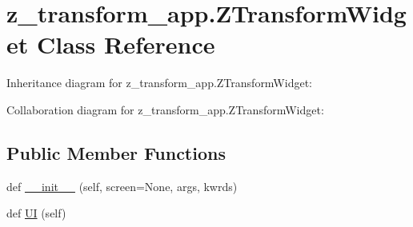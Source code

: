 \hypertarget{classz__transform__app_1_1ZTransformWidget}{}\section{z\+\_\+transform\+\_\+app.\+Z\+Transform\+Widget Class Reference}
\label{classz__transform__app_1_1ZTransformWidget}


Inheritance diagram for z\+\_\+transform\+\_\+app.\+Z\+Transform\+Widget\+:


Collaboration diagram for z\+\_\+transform\+\_\+app.\+Z\+Transform\+Widget\+:
\subsection*{Public Member Functions}
\begin{DoxyCompactItemize}
\item 
def \hyperlink{classz__transform__app_1_1ZTransformWidget_a730d716201ec9a62a188b9ec39ff288f}{\+\_\+\+\_\+init\+\_\+\+\_\+} (self, screen=None, args, kwrds)
\item 
def \hyperlink{classz__transform__app_1_1ZTransformWidget_ad806831916f7d8246a281dbcc3ea58f7}{UI} (self)
\end{DoxyCompactItemize}
